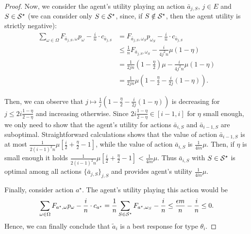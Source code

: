 \begin{proof}
   Now, we consider the agent's utility playing an action $\bar a_{j, S}$, $j\in E$ and $S\in\mathcal{S}^\star$ (we can consider only $S\in\mathcal{S}^\star$, since, if $S\notin\mathcal{S}^\star$, then the agent utility is strictly negative):
	\begin{align*}
		\sum_{\omega \in \Omega} F_{ \bar a_{j, S}, \omega } p_\omega - \frac{i}{n} \cdot c_{\bar a_{j, S}} &=  F_{ \bar a_{j, S}, {\omega_{S}}} p_{\omega_S}  - \frac{i}{n} \cdot c_{\bar a_{j, S}}\\
		&\le \frac{1}{n} F_{ \bar a_{j, S}, {\omega_{S}}} -\frac{i}{4j^2n}\mu(1-\eta) \\
		&=\frac{1}{2jn}\left(1-\frac\eta2\right)\mu-\frac{i}{4j^2n}\mu(1-\eta) \\
	&=\frac{1}{2jn}\mu\left(1-\frac{\eta}{2}-\frac{i}{2j}(1-\eta)\right).
	\end{align*}
	
	Then, we can observe that $j\mapsto \frac{1}{j}\left(1-\frac{\eta}{2}-\frac{i}{2j}(1-\eta)\right)$ is decreasing for $j\le 2i\frac{1-\eta}{2-\eta}$ and increasing otherwise. Since $2i\frac{1-\eta}{2-\eta}\in[i-1, i]$ for $\eta$ small enough, we only need to show that the agent's utility for actions $\bar a_{i, S}$ and $\bar a_{i-1, S}$ are suboptimal.
	Straightforward calculations shows that the value of action $\bar a_{i-1, S}$ is at most $\frac{1}{2(i-1)^2n}\mu\left[\frac{i}{2}+\frac{\eta}{2}-1
    \right]$, while the value of action $\bar a_{i, S}$ is $\frac{1}{4in}\mu$. Then, if $\eta$ is small enough it holds $\frac{1}{2(i-1)^2n}\mu\left[\frac{i}{2}+\frac{\eta}{2}-1
    \right] <\frac{1}{4in}\mu$. Thus $\bar a_{i, S}$ with $S\in\mathcal{S}^\star$ is optimal among all actions $\{\bar a_{j, S}\}_{j, S}$ and provides agent's utility $\frac{1}{4in}\mu$.
	
    Finally, consider action $a^\star$. The agent's utility playing this action would be
	\begin{align*}
		\sum_{\omega\in \Omega} F_{a^\star,\omega}p_\omega - \frac{i}{n}\cdot c_{a^\star}  = \frac{1}{n}\sum_{S\in \mathcal{S}^\star} F_{a^\star,\omega_S} - \frac{i}{n}
		\le \frac{\epsilon m}{n} - \frac{i}{n}
		\le 0.
	\end{align*}
    Hence, we can finally conclude that $\tilde a_i$ is a best response for type $\theta_i$.
\end{proof}


